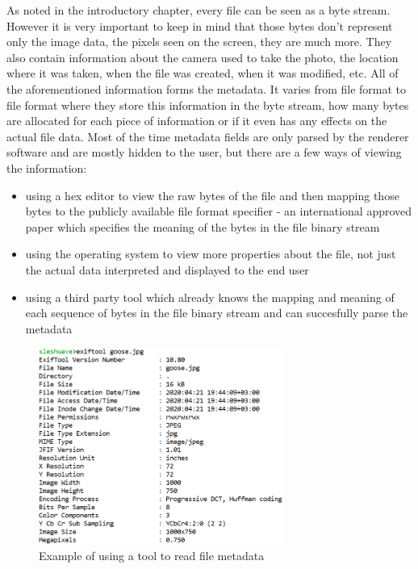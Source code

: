 \begin{multicols*}{2}
As noted in the introductory chapter, every file can be seen as a byte stream. However it is very important to keep in mind that those bytes don't represent only the image data, the pixels seen on the screen, they are much more. They also contain information about the camera used to take the photo, the location where it was taken, when the file was created, when it was modified, etc. All of the aforementioned information forms the metadata. It varies from file format to file format where they store this information in the byte stream, how many bytes are allocated for each piece of information or if it even has any effects on the actual file data. Most of the time metadata fields are only parsed by the renderer software and are mostly hidden to the user, but there are a few ways of viewing the information: 
\begin{itemize}
  \item using a hex editor to view the raw bytes of the file and then mapping those bytes to the publicly available file format specifier - an international approved paper which specifies the meaning of the bytes in the file binary stream
  \item using the operating system to view more properties about the file, not just the actual data interpreted and displayed to the end user
  \item using a third party tool which already knows the mapping and meaning of each sequence of bytes in the file binary stream and can succesfully parse the metadata
\end{itemize}

\begin{figure}[H]
    \centering
    \includegraphics[width=8cm,keepaspectratio]{pics/exiftool_file_metadata}
    \caption{Example of using a tool to read file metadata}
    \label{Goose Image File Metadata using Exiftool}
\end{figure}


\end{multicols*}
